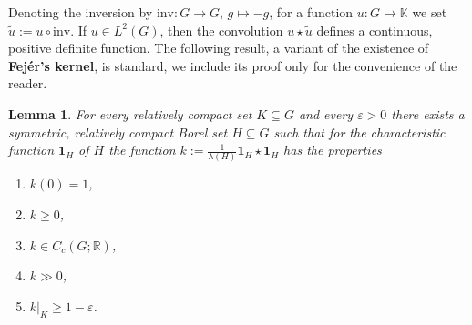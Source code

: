 \documentclass[[a4paper,english,12pt]{amsart}
\theoremstyle{plain}
\newtheorem{lemma}[theorem]{Lemma}
\theoremstyle{remark}
\newcommand{\ve}{\varepsilon}
\newcommand{\KK}{\mathbb K}
\newcommand{\RR}{\mathbb R}
\def\inv{\mathrm{inv}}
\def\haar{\lambda}
\def\one{\mathbf{1}}
\begin{document}
Denoting the inversion by $\inv:G\to G$, $g\mapsto -g$, for a function $u:G\to \KK$ we set $\widetilde u:=\overline{u\circ \inv}$. If $u\in L^2(G)$, then the convolution $u \star \widetilde u$ defines a  continuous, positive definite function.
The following result, a variant of the existence of \textbf{Fejér's kernel}, is standard, we include its proof only for the convenience of the reader.
\begin{lemma}\label{l:posdefkernel}
	For every relatively compact set $K \subseteq  G$ and every $\ve>0$ there exists a symmetric, relatively compact Borel set $H \subseteq G$ such that for the characteristic function $\one_H$ of $H$ the function   $k:=\frac1{\haar(H)}\one_H \star \one_H$ has  the properties
\begin{enumerate}[(1)]
\item $k(0)=1$,
\item $k \ge 0$,
\item $k \in C_c(G;\RR)$,
\item $k \gg 0$,
\item $k|_K \ge 1-\ve$.
\end{enumerate}
\end{lemma}
\end{document}
